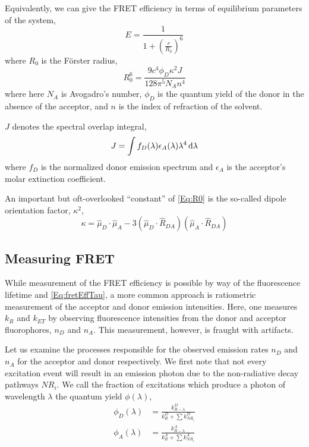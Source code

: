 \documentclass{article}
\newcommand{\NR}{\ensuremath{\mathit{NR}}}          %
\newcommand{\ET}{\ensuremath{\mathit{ET}}}          %
\begin{document}
Equivalently, we can give the FRET efficiency in terms of equilibrium
parameters of the system,
\begin{equation}
  E = \frac{1}{1 + \left( \frac{r}{R_0} \right)^6}
  \label{Eq:fretEff}
\end{equation}
where $R_0$ is the F\"orster radius,
\begin{equation}
  R_0^6 = \frac{9 c^4 \phi_D \kappa^2 J}{128 \pi^5 N_A n^4}
  \label{Eq:R0}
\end{equation}
where here $N_A$ is Avogadro's number, $\phi_D$ is the quantum yield of the
donor in the absence of the acceptor, and $n$ is the index of
refraction of the solvent.

$J$ denotes the spectral overlap integral,
\[ J = \int f_D(\lambda) \epsilon_A(\lambda) \lambda^4 \dif\lambda \]
where $f_D$ is the normalized donor emission spectrum and $\epsilon_A$
is the acceptor's molar extinction coefficient.

An important but oft-overlooked ``constant'' of \eqref{Eq:R0} is
the so-called dipole orientation factor, $\kappa^2$,
\begin{equation}
  \kappa = \hat\mu_D \cdot \hat\mu_A - 3(\hat\mu_D \cdot \hat R_{DA}) (\hat\mu_A \cdot \hat R_{DA})
  \label{Eq:kappa}
\end{equation}

\subsection{Measuring FRET}
While measurement of the FRET efficiency is possible by way of the
fluorescence lifetime and \eqref{Eq:fretEffTau}, a more common
approach is ratiometric measurement of the acceptor and donor emission
intensities\cite{Dahan1999}. Here, one measures $k_R$ and $k_\ET$ by observing
fluorescence intensities from the donor and acceptor fluorophores,
$n_D$ and $n_A$. This measurement, however, is fraught with
artifacts.

Let us examine the processes responsible for the observed emission rates
$n_D$ and $n_A$ for the acceptor and donor respectively. We first note
that not every excitation event will result in an emission photon due
to the non-radiative decay pathways $\NR_i$. We call the fraction of
excitations which produce a photon of wavelength $\lambda$ the quantum
yield $\phi(\lambda)$,
\begin{align*}
  \phi_D(\lambda) & = \frac{k^D_{R-\lambda}}{k^D_R + \sum k^D_{\NR_i}} \\
  \phi_A(\lambda) & = \frac{k^A_{R-\lambda}}{k^A_R + \sum k^A_{\NR_i}} \\
\end{align*}
\end{document}
